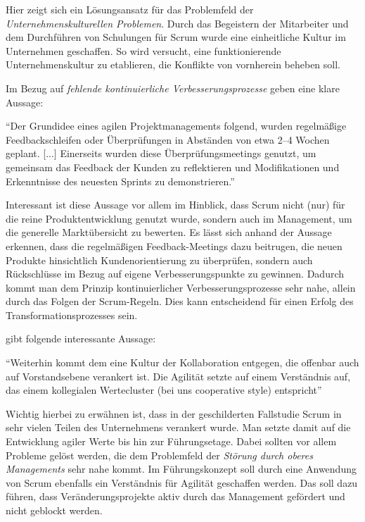 Hier zeigt sich ein Lösungsansatz für das Problemfeld der \textit{Unternehmenskulturellen Problemen}. Durch das Begeistern der Mitarbeiter und dem Durchführen von Schulungen für Scrum wurde eine einheitliche Kultur im Unternehmen geschaffen. So wird versucht, eine funktionierende Unternehmenskultur zu etablieren, die Konflikte von vornherein beheben soll.

Im Bezug auf \textit{fehlende kontinuierliche Verbesserungsprozesse} geben  eine klare Aussage:

\begin{center}
	``Der Grundidee eines agilen Projektmanagements folgend, wurden regelmäßige Feedbackschleifen oder Überprüfungen in Abständen von etwa 2–4 Wochen geplant. [...] Einerseits wurden diese Überprüfungsmeetings genutzt, um gemeinsam das Feedback der Kunden zu reflektieren und Modifikationen und Erkenntnisse des neuesten Sprints zu demonstrieren.'' \cite[S. 146]{urbach_digitalization_2018}
\end{center}

Interessant ist diese Aussage vor allem im Hinblick, dass Scrum nicht (nur) für die reine Produktentwicklung genutzt wurde, sondern auch im Management, um die generelle Marktübersicht zu bewerten. Es lässt sich anhand der Aussage erkennen, dass die regelmäßigen Feedback-Meetings dazu beitrugen, die neuen Produkte hinsichtlich Kundenorientierung zu überprüfen, sondern auch Rückschlüsse im Bezug auf eigene Verbesserungspunkte zu gewinnen. Dadurch kommt man dem Prinzip kontinuierlicher Verbesserungsprozesse sehr nahe, allein durch das Folgen der Scrum-Regeln. Dies kann entscheidend für einen Erfolg des Transformationsprozesses sein.

 gibt folgende interessante Aussage: 

\begin{center}
	``Weiterhin kommt dem eine Kultur der Kollaboration entgegen, die offenbar auch auf Vorstandsebene verankert ist. Die Agilität setzte auf einem Verständnis auf, das einem kollegialen Wertecluster (bei uns cooperative style) entspricht'' \cite[S. 210]{hofert_agile_2018}
\end{center}

Wichtig hierbei zu erwähnen ist, dass in der geschilderten Fallstudie Scrum in sehr vielen Teilen des Unternehmens verankert wurde. Man setzte damit auf die Entwicklung agiler Werte bis hin zur Führungsetage. Dabei sollten vor allem Probleme gelöst werden, die dem Problemfeld der \textit{Störung durch oberes Managements} sehr nahe kommt. Im Führungskonzept soll durch eine Anwendung von Scrum ebenfalls ein Verständnis für Agilität geschaffen werden. Das soll dazu führen, dass Veränderungsprojekte aktiv durch das Management gefördert und nicht geblockt werden.

